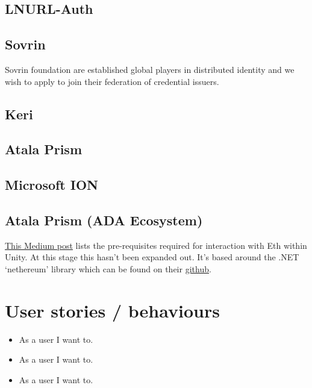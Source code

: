 \subsection{LNURL-Auth}
\lipsum[50]
\subsection{Sovrin}
Sovrin foundation are established global players in distributed identity and we wish to apply to join their federation of credential issuers.
\subsection{Keri}
\lipsum[50]
\subsection{Atala Prism}
\lipsum[50]
\subsection{Microsoft ION}
\lipsum[50]



\subsection{Atala Prism (ADA Ecosystem)}
\href{https://medium.com/coinmonks/part-2-using-nethereum-in-unity-5b09f2d8c718}{This Medium post} lists the pre-requisites required for interaction with Eth within Unity. At this stage this hasn't been expanded out. It's based around the .NET `nethereum' library which can be found on their \href{https://github.com/Nethereum/Nethereum}{github}.    
   
  
\section{User stories / behaviours}
\label{behaviours}

\begin{itemize}
\item As a user I want to.
\item As a user I want to.
\item As a user I want to.
\end{itemize}

